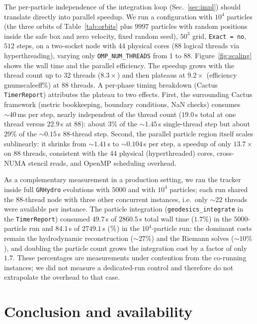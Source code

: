 \documentclass[11pt]{article}
\newcommand{\num}[1]{\csname gnum#1\endcsname}
\begin{document}
The per-particle independence of the integration loop
(Sec.~\ref{sec:impl}) should translate directly into parallel speedup.  We
run a configuration with $10^4$ particles (the three orbits of
Table~\ref{tab:orbits} plus $9997$ particles with random positions inside
the safe box and zero velocity, fixed random seed), $50^3$ grid,
\texttt{Exact = no}, $512$ steps, on a two-socket node with 44 physical
cores (88 logical threads via hyperthreading), varying only
\texttt{OMP\_NUM\_THREADS} from 1 to 88.  Figure~\ref{fig:scaling} shows the
wall time and the parallel efficiency.  The speedup grows with the thread
count up to 32 threads ($8.3\times$) and then plateaus at $9.2\times$
(efficiency \num{scaleeff}\%) at 88 threads.  A per-phase timing breakdown
(Cactus \texttt{TimerReport}) attributes the plateau to two effects.
First, the surrounding Cactus framework (metric bookkeeping, boundary
conditions, NaN checks) consumes $\sim\!40$\,ms per step, nearly independent
of the thread count ($19.0$\,s total at one thread versus $22.9$\,s at 88):
about $3\%$ of the $\sim\!1.45$\,s single-thread step but about $29\%$ of
the $\sim\!0.15$\,s 88-thread step.
Second, the parallel particle region itself scales sublinearly: it shrinks
from $\sim\!1.41$\,s to $\sim\!0.104$\,s per step, a speedup of only
$13.7\times$ on 88 threads, consistent with the 44 physical (hyperthreaded)
cores, cross-NUMA stencil reads, and OpenMP scheduling overhead.

As a complementary measurement in a production setting, we ran the tracker
inside full \texttt{GRHydro} evolutions \citep{font2008} with $5000$ and with $10^4$
particles; each run shared the 88-thread node with three other concurrent
instances, i.e.\ only $\sim\!22$ threads were available per instance.  The
particle integration (\texttt{geodesics\_integrate} in the
\texttt{TimerReport}) consumed $49.7$\,s of $2860.5$\,s total wall time
($1.7\%$) in the $5000$-particle run and $84.1$\,s of $2749.1$\,s
($\num{hydrofrac}\%$) in the $10^4$-particle run: the dominant costs remain
the hydrodynamic reconstruction ($\sim\!27\%$) and the Riemann solves
($\sim\!10\%$), and doubling the particle count grows the integration cost
by a factor of only $1.7$.  These percentages are measurements under
contention from the co-running instances; we did not measure a dedicated-run
control and therefore do not extrapolate the overhead to that case.

\section{Conclusion and availability}\label{sec:concl}
\end{document}
